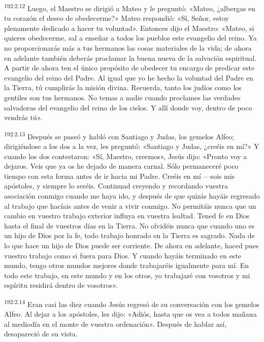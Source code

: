 \par 
\textsuperscript{192:2.12} Luego, el Maestro se dirigió a Mateo y le preguntó: «Mateo, ¿albergas en tu corazón el deseo de obedecerme?» Mateo respondió: «Sí, Señor, estoy plenamente dedicado a hacer tu voluntad». Entonces dijo el Maestro: «Mateo, si quieres obedecerme, sal a enseñar a todos los pueblos este evangelio del reino. Ya no proporcionarás más a tus hermanos las cosas materiales de la vida; de ahora en adelante también deberás proclamar la buena nueva de la salvación espiritual. A partir de ahora ten el único propósito de obedecer tu encargo de predicar este evangelio del reino del Padre. Al igual que yo he hecho la voluntad del Padre en la Tierra, tú cumplirás la misión divina. Recuerda, tanto los judíos como los gentiles son tus hermanos. No temas a nadie cuando proclames las verdades salvadoras del evangelio del reino de los cielos. Y allí donde voy, dentro de poco vendrás tú».

\par 
\textsuperscript{192:2.13} Después se paseó y habló con Santiago y Judas, los gemelos Alfeo; dirigiéndose a los dos a la vez, les preguntó: «Santiago y Judas, ¿creéis en mí?» Y cuando los dos contestaron: «Sí, Maestro, creemos», Jesús dijo: «Pronto voy a dejaros. Veis que ya os he dejado de manera carnal. Sólo permaneceré poco tiempo con esta forma antes de ir hacia mi Padre. Creéis en mí ---sois mis apóstoles, y siempre lo seréis. Continuad creyendo y recordando vuestra asociación conmigo cuando me haya ido, y después de que quizás hayáis regresado al trabajo que hacíais antes de venir a vivir conmigo. No permitáis nunca que un cambio en vuestro trabajo exterior influya en vuestra lealtad. Tened fe en Dios hasta el final de vuestros días en la Tierra. No olvidéis nunca que cuando uno es un hijo de Dios por la fe, todo trabajo honrado en la Tierra es sagrado. Nada de lo que hace un hijo de Dios puede ser corriente. De ahora en adelante, haced pues vuestro trabajo como si fuera para Dios. Y cuando hayáis terminado en este mundo, tengo otros mundos mejores donde trabajaréis igualmente para mí. En todo este trabajo, en este mundo y en los otros, yo trabajaré con vosotros y mi espíritu residirá dentro de vosotros».

\par 
\textsuperscript{192:2.14} Eran casi las diez cuando Jesús regresó de su conversación con los gemelos Alfeo. Al dejar a los apóstoles, les dijo: «Adiós, hasta que os vea a todos mañana al mediodía en el monte de vuestra ordenación». Después de hablar así, desapareció de su vista.

